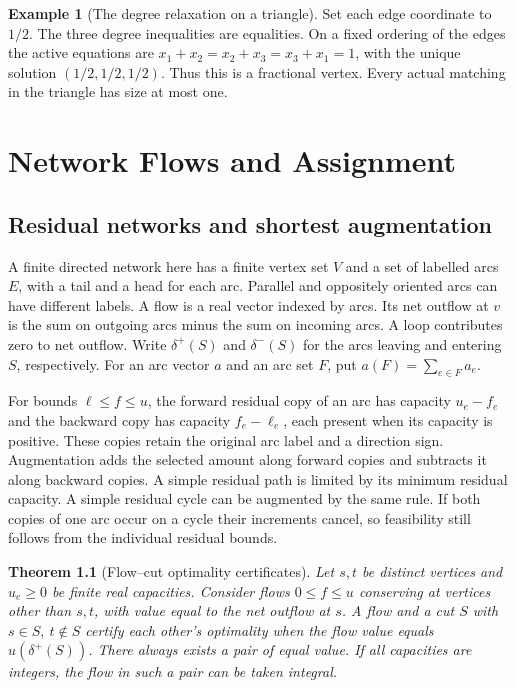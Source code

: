 \documentclass[11pt,oneside,openany]{book}
\theoremstyle{plain}
\newtheorem{theorem}{Theorem}[chapter]
\theoremstyle{definition}
\newtheorem{example}[theorem]{Example}
\theoremstyle{remark}
\begin{document}
\begin{example}[The degree relaxation on a triangle]
Set each edge coordinate to \(1/2\). The three degree inequalities
are equalities. On a fixed ordering of the edges the active
equations are \(x_1+x_2=x_2+x_3=x_3+x_1=1\), with the unique
solution \((1/2,1/2,1/2)\). Thus this is a fractional vertex.
Every actual matching in the triangle has size at most one.
\end{example}
\chapter{Network Flows and Assignment}\label{p205:ch08}

\section{Residual networks and shortest augmentation}

A finite directed network here has a finite vertex set \(V\) and
a set of labelled arcs \(E\), with a tail and a head for each arc.
Parallel and oppositely oriented arcs can have different labels.
A flow is a real vector indexed by arcs. Its net outflow at \(v\)
is the sum on outgoing arcs minus the sum on incoming arcs.
A loop contributes zero to net outflow. Write \(\delta^+(S)\) and
\(\delta^-(S)\) for the arcs leaving and entering \(S\), respectively.
For an arc vector \(a\) and an arc set \(F\), put
\(a(F)=\sum_{e\in F}a_e\).

For bounds \(\ell\le f\le u\), the forward residual copy of an
arc has capacity \(u_e-f_e\) and the backward copy has capacity
\(f_e-\ell_e\), each present when its capacity is positive. These
copies retain the original arc label and a direction sign.
Augmentation adds the selected amount along forward copies and
subtracts it along backward copies. A simple residual path is
limited by its minimum residual capacity. A simple residual
cycle can be augmented by the same rule. If both copies of one
arc occur on a cycle their increments cancel, so feasibility
still follows from the individual residual bounds.

\begin{theorem}[Flow--cut optimality certificates]\label{p205:W36}
Let \(s,t\) be distinct vertices and \(u_e\ge0\) be finite real
capacities. Consider flows \(0\le f\le u\) conserving at vertices
other than \(s,t\), with value equal to the net outflow at \(s\).
A flow and a cut \(S\) with \(s\in S,\ t\notin S\) certify each
other's optimality when the flow value equals \(u(\delta^+(S))\).
There always exists a pair of equal value. If all capacities
are integers, the flow in such a pair can be taken integral.
\end{theorem}
\end{document}

